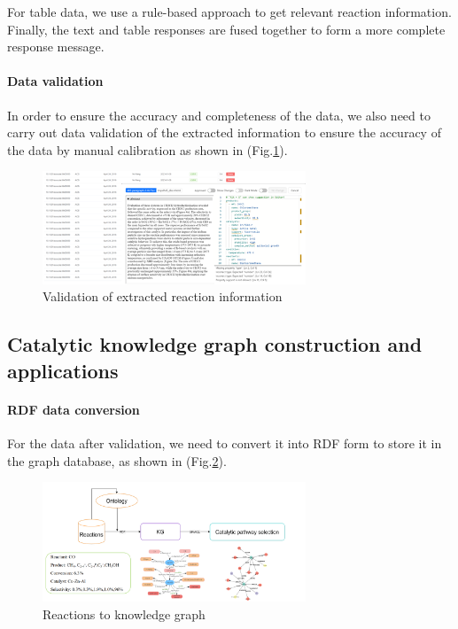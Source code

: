 \documentclass[%
 aip,
 jmp,%
 amsmath,amssymb,
 reprint,%
]{revtex4-2}
\begin{document}
For table data, we use a rule-based approach to get relevant reaction information. Finally, the text and table responses are fused together to form a more complete response message.

\paragraph{Data validation}In order to ensure the accuracy and completeness of the data, we also need to carry out data validation of the extracted information to ensure the accuracy of the data by manual calibration as shown in (Fig.\ref{ Fig.19 }).

\begin{figure}[htbp]
 \centering
 \includegraphics[width=0.7\textwidth]{figure/19.png}
 \caption{ Validation of extracted reaction information }
 \label{ Fig.19 }
\end{figure}

\subsection{Catalytic knowledge graph construction and applications}

\paragraph{RDF data conversion}For the data after validation, we need to convert it into RDF form to store it in the graph database, as shown in (Fig.\ref{ Fig.20 }).

\begin{figure}[htbp]
 \centering
 \includegraphics[width=0.7\textwidth]{figure/20.png}
 \caption{ Reactions to knowledge graph }
 \label{ Fig.20 }
\end{figure}
\end{document}
